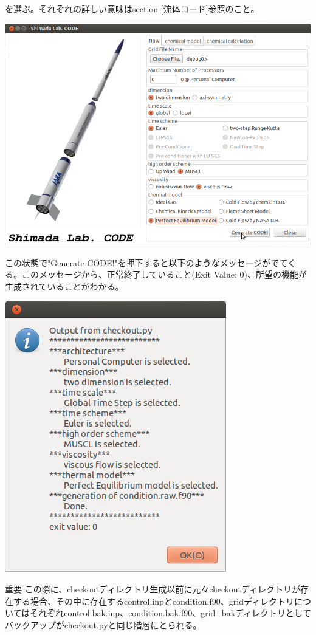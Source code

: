 \documentclass{jsarticle}
\begin{document}
を選ぶ。それぞれの詳しい意味はsection \ref{流体コード}参照のこと。
\begin{center}
\includegraphics[width=.8\textwidth,bb=0 0 895 649]{tutorial_img/150.png}
\end{center}
この状態で"Generate CODE!"を押下すると以下のようなメッセージがでてくる。このメッセージから、正常終了していること(Exit Value: 0)、所望の機能が生成されていることがわかる。
\begin{center}
\includegraphics[width=.5\textwidth,bb=0 0 364 446]{tutorial_img/160.png}
\end{center}
\begin{itembox}[l]{重要}
この際に、checkoutディレクトリ生成以前に元々checkoutディレクトリが存在する場合、その中に存在するcontrol.inpとcondition.f90、gridディレクトリについてはそれぞれcontrol.bak.inp、condition.bak.f90、grid\_bakディレクトリとしてバックアップがcheckout.pyと同じ階層にとられる。
\end{itembox}
\end{document}
